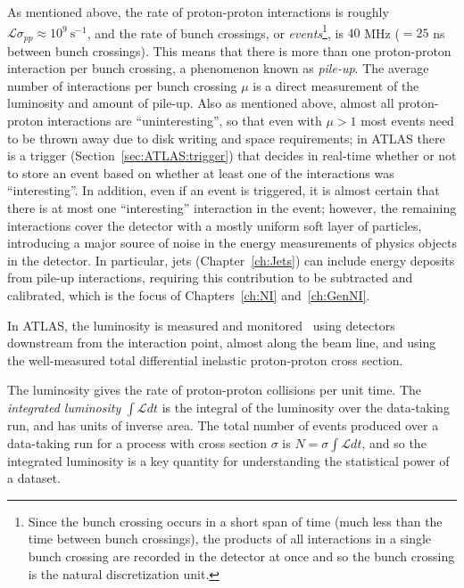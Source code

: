 As mentioned above, the rate of proton-proton interactions is roughly $\mathcal{L}\sigma_{pp} \approx 10^9~\text{s}^{-1}$, and the rate of bunch crossings, or \textit{events}\footnote{Since the bunch crossing occurs in a short span of time (much less than the time between bunch crossings), the products of all interactions in a single bunch crossing are recorded in the detector at once and so the bunch crossing is the natural discretization unit.}, is $40$ MHz ($=25$ ns between bunch crossings).
This means that there is more than one proton-proton interaction per bunch crossing, a phenomenon known as \textit{pile-up}.
The average number of interactions per bunch crossing $\mu$ is a direct measurement of the luminosity and amount of pile-up.
Also as mentioned above, almost all proton-proton interactions are ``uninteresting'', so that even with $\mu>1$ most events need to be thrown away due to disk writing and space requirements; in ATLAS there is a trigger (Section~\ref{sec:ATLAS:trigger}) that decides in real-time whether or not to store an event based on whether at least one of the interactions was ``interesting''.
In addition, even if an event is triggered, it is almost certain that there is at most one ``interesting'' interaction in the event; however, the remaining interactions cover the detector with a mostly uniform soft layer of particles, introducing a major source of noise in the energy measurements of physics objects in the detector.
In particular, jets (Chapter~\ref{ch:Jets}) can include energy deposits from pile-up interactions, requiring this contribution to be subtracted and calibrated, which is the focus of Chapters~\ref{ch:NI} and~\ref{ch:GenNI}.

In ATLAS, the luminosity is measured and monitored~\cite{LUCID2} using detectors downstream from the interaction point, almost along the beam line, and using the well-measured total differential inelastic proton-proton cross section.

The luminosity gives the rate of proton-proton collisions per unit time.
The \textit{integrated luminosity} $\int\mathcal{L}dt$ is the integral of the luminosity over the data-taking run, and has units of inverse area.
The total number of events produced over a data-taking run for a process with cross section $\sigma$ is $N = \sigma\int\mathcal{L}dt$, and so the integrated luminosity is a key quantity for understanding the statistical power of a dataset.

